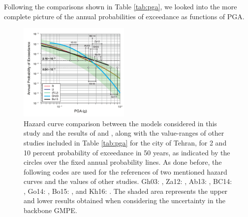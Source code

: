 Following the comparisons shown in Table \ref{tab:pga}, we looked into the more complete picture of the annual probabilities of exceedance as functions of PGA.

\begin{figure}[t]
    \centering
    \includegraphics[width=0.48\textwidth]{figures/pdf/figure-14}
    \caption{Hazard curve comparison between the models considered in this study and the results of \citet{Ghodrati2003} and \citet{Boostan2015}, along with the value-ranges of other studies included in Table \ref{tab:pga} for the city of Tehran, for 2 and 10 percent probability of exceedance in 50 years, as indicated by the circles over the fixed annual probability lines. As done before, the following codes are used for the references of two mentioned hazard curves and the values of other studies.
        Gh03: \citet{Ghodrati2003},
        Za12: \citet{Zare2012},
        Ab13: \citet{Abdi2013},
        BC14: \citet{BHRC2014},
        Go14: \citet{Golara2014},
        Bo15: \citet{Boostan2015}, and
        Kh16: \citet{Khodaverdian_2016_BSSA}.
    The shaded area represents the upper and lower results obtained when considering the uncertainty in the backbone GMPE.}
    \label{fig:tehran}
\end{figure}

